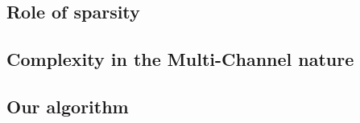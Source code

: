 
\subsection{Role of sparsity}

\subsection{Complexity in the Multi-Channel nature}

\subsection{Our algorithm}

